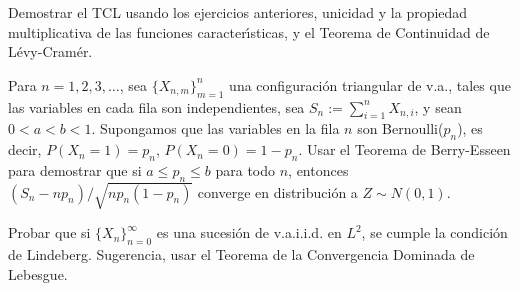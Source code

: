 
\begin{problem}[8] Demostrar el TCL usando los ejercicios anteriores, unicidad y la propiedad multiplicativa de las funciones
caracter\'{\i}sticas, y el Teorema de Continuidad de L\'evy-Cram\'er.
\solution

\begin{expla}

\end{expla}

\end{problem}


\begin{problem}[9]Para $n=1, 2, 3, \dots$, sea  $\{X_{n,m}\}_{m=1}^{n}$  una configuraci\'on triangular de v.a., tales que las variables en cada fila son independientes, sea $S_{n} := \sum_{i=1}^n X_{n,i}$, y sean $0 < a < b < 1$. Supongamos que las
variables en la fila $n$ son Bernoulli($p_n$), es decir, $P(X_n = 1) = p_n$, $P(X_n = 0) = 1 - p_n$.
Usar el Teorema de Berry-Esseen para demostrar que si $a \le p_n \le b$ para todo $n$,
entonces $(S_n - n p_n)/\sqrt{n p_n (1 - p_n)}$ converge en distribuci\'on a $Z\sim N(0,1)$.
\solution

\begin{expla}

\end{expla}

\end{problem}


\begin{problem}[10]Probar que si $\{X_n\}_{n=0}^{\infty}$  es una sucesi\'on de v.a.i.i.d. en $L^2$, se cumple
la condici\'on de Lindeberg. Sugerencia, usar el Teorema de la Convergencia Dominada de
Lebesgue.
\solution

\begin{expla}

\end{expla}

\end{problem}


